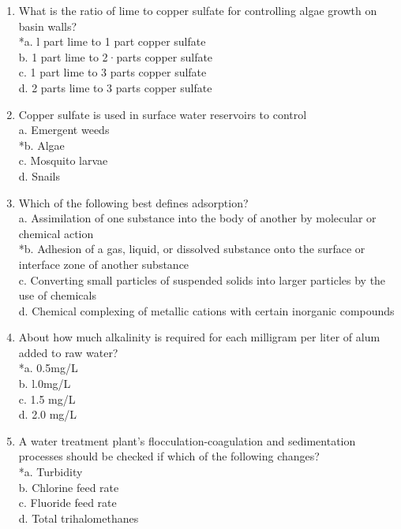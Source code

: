 \begin{enumerate}
\item What is the ratio of lime to copper sulfate for controlling algae growth on basin walls?\\
*a.	l part lime to 1 part copper sulfate\\
b.	1 part lime to 2·parts copper sulfate\\
c.	1 part lime to 3 parts copper sulfate\\
d.	2 parts lime to 3 parts copper sulfate\\

\item Copper sulfate is used in surface water reservoirs to control\\
a.	Emergent  weeds\\
*b.	Algae\\
c.	Mosquito larvae\\
d.	Snails\\

\item Which of the following best defines adsorption?\\
a.	Assimilation of one substance into the body of another by molecular or chemical action\\
*b.	Adhesion of a gas, liquid, or dissolved substance onto the surface or interface zone of another substance\\
c.	Converting small particles of suspended solids into larger particles by the use of chemicals\\
d.	Chemical complexing of metallic cations with certain inorganic compounds\\

\item About how much alkalinity is required for each milligram per liter of alum added to raw water?\\
*a.	0.5mg/L\\
b.	l.0mg/L\\
c.	1.5 mg/L\\
d.	2.0 mg/L\\

\item A water treatment plant's flocculation-coagulation and sedimentation processes should be checked if which of the following changes?\\
*a.	Turbidity\\
b.	Chlorine feed rate\\
c.	Fluoride feed rate\\
d.	Total trihalomethanes\\


\end{enumerate}
